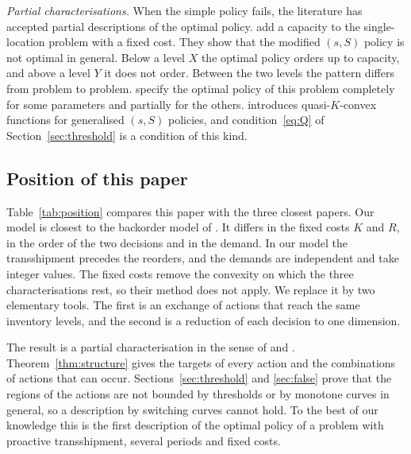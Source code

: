 \documentclass[11pt]{article}
\theoremstyle{definition}
\begin{document}
\emph{Partial characterisations.} When the simple policy fails, the literature has accepted partial descriptions of the optimal policy. \citet{shaoxiang1996xy} add a capacity to the single-location problem with a fixed cost. They show that the modified $(s,S)$ policy is not optimal in general. Below a level $X$ the optimal policy orders up to capacity, and above a level $Y$ it does not order. Between the two levels the pattern differs from problem to problem. \citet{gallego2000capacitated} specify the optimal policy of this problem completely for some parameters and partially for the others. \citet{porteus1971optimality} introduces quasi-$K$-convex functions for generalised $(s,S)$ policies, and condition~\eqref{eq:Q} of Section~\ref{sec:threshold} is a condition of this kind.

\subsection{Position of this paper}

Table~\ref{tab:position} compares this paper with the three closest papers. Our model is closest to the backorder model of \citet{xu2023optimal}. It differs in the fixed costs $K$ and $R$, in the order of the two decisions and in the demand. In our model the transshipment precedes the reorders, and the demands are independent and take integer values. The fixed costs remove the convexity on which the three characterisations rest, so their method does not apply. We replace it by two elementary tools. The first is an exchange of actions that reach the same inventory levels, and the second is a reduction of each decision to one dimension.

The result is a partial characterisation in the sense of \citet{shaoxiang1996xy} and \citet{gallego2000capacitated}. Theorem~\ref{thm:structure} gives the targets of every action and the combinations of actions that can occur. Sections~\ref{sec:threshold} and \ref{sec:false} prove that the regions of the actions are not bounded by thresholds or by monotone curves in general, so a description by switching curves cannot hold. To the best of our knowledge this is the first description of the optimal policy of a problem with proactive transshipment, several periods and fixed costs.
\end{document}
